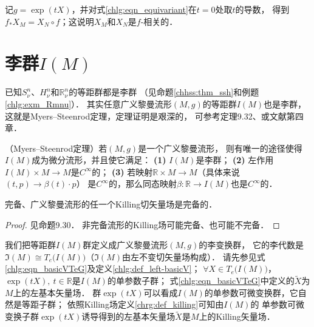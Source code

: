 记$g=\exp(t X)$，并对式\eqref{chlg:eqn_equivariant}在$t=0$处取$t$的导数，
得到$f_* X_M = X_N \circ f$；这说明$X_M$和$X_N$是$f$-相关的．




\section{李群$I(M)$}\label{chlg:sec_IM}

已知$S^n_\nu$、$H^n_\nu$和$\mathbb{R}^n_\nu$的等距群都是{\kaishu 李群}
（见命题\ref{chhss:thm_ssh}和例题\ref{chlg:exm_Rmnu}）．
其实任意广义黎曼流形$(M,g)$的等距群$I(M)$也是{\kaishu 李群}，
这就是Myers--Steenrod定理，定理证明是艰深的，
可参考\parencite{oneill1983}定理9.32、或文献\parencite{palais-1957}第四章．



\begin{theorem}\label{chlg:thm_ISOM}
    （Myers--Steenrod定理）若$(M,g)$是一个广义黎曼流形，
    则有唯一的途径使得$I(M)$成为微分流形，并且使它满足：
    {\bfseries (1)} $I(M)$是李群；
    {\bfseries (2)} 左作用$I(M)\times M\to M$是$C^\infty$的；
    {\bfseries (3)} 若映射$\mathbb{R}\times M\to M$（具体来说$(t,p)\to \beta(t)\cdot p$）
    是$C^\infty$的，那么同态映射$\beta : \mathbb{R}\to I(M)$也是$C^\infty$的．
\end{theorem}



\begin{theorem}\label{chlg:thm_comp-kill}
    完备、广义黎曼流形的任一个Killing切矢量场是完备的．
\end{theorem}
\begin{proof}
    见\parencite{oneill1983}命题9.30．
    非完备流形的Killing场可能完备、也可能不完备．
\end{proof}


我们把等距群$I(M)$群定义成广义黎曼流形$(M,g)$的李变换群，
它的李代数是$\mathfrak{I}(M)\cong T_e\bigl(I(M)\bigr)$（$\mathfrak{I}(M)$由左不变切矢量场构成）．
请先参见式\eqref{chlg:eqn_basicVTeG}及定义\ref{chlg:def_left-basicV}；
$\forall X\in T_e\bigl(I(M)\bigr)$，$\exp(t X),\ t\in \mathbb{R}$是$I(M)$的单参数子群；
式\eqref{chlg:eqn_basicVTeG}中定义的$\widetilde{X}$为$M$上的左基本矢量场．
群$\exp(t X)$可以看成$I(M)$的单参数可微变换群，它自然是{\kaishu 等距}子群；
依照Killing场定义\ref{chrg:def_killing}可知由$I(M)$的
单参数可微变换子群$\exp(t X)$诱导得到的左基本矢量场$\widetilde{X}$是$M$上的Killing矢量场．



